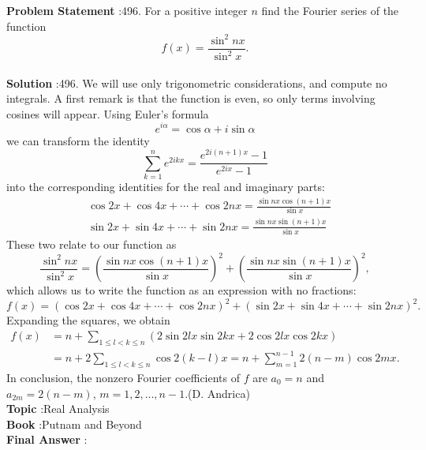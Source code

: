 \documentclass[10pt]{article}
\begin{document}
\textbf{Problem Statement} :496. For a positive integer $n$ find the Fourier series of the function$$ f(x)=\frac{\sin ^{2} n x}{\sin ^{2} x} . $$\\
\textbf{Solution} :496. We will use only trigonometric considerations, and compute no integrals. A first remark is that the function is even, so only terms involving cosines will appear. Using Euler's formula$$ e^{i \alpha}=\cos \alpha+i \sin \alpha $$we can transform the identity$$ \sum_{k=1}^{n} e^{2 i k x}=\frac{e^{2 i(n+1) x}-1}{e^{2 i x}-1} $$into the corresponding identities for the real and imaginary parts:$$ \begin{aligned} &\cos 2 x+\cos 4 x+\cdots+\cos 2 n x=\frac{\sin n x \cos (n+1) x}{\sin x} \\ &\sin 2 x+\sin 4 x+\cdots+\sin 2 n x=\frac{\sin n x \sin (n+1) x}{\sin x} \end{aligned} $$These two relate to our function as$$ \frac{\sin ^{2} n x}{\sin ^{2} x}=\left(\frac{\sin n x \cos (n+1) x}{\sin x}\right)^{2}+\left(\frac{\sin n x \sin (n+1) x}{\sin x}\right)^{2}, $$which allows us to write the function as an expression with no fractions:$$ f(x)=(\cos 2 x+\cos 4 x+\cdots+\cos 2 n x)^{2}+(\sin 2 x+\sin 4 x+\cdots+\sin 2 n x)^{2} . $$Expanding the squares, we obtain$$ \begin{aligned} f(x) &=n+\sum_{1 \leq l<k \leq n}(2 \sin 2 l x \sin 2 k x+2 \cos 2 l x \cos 2 k x) \\ &=n+2 \sum_{1 \leq l<k \leq n} \cos 2(k-l) x=n+\sum_{m=1}^{n-1} 2(n-m) \cos 2 m x . \end{aligned} $$In conclusion, the nonzero Fourier coefficients of $f$ are $a_{0}=n$ and $a_{2 m}=2(n-m)$, $m=1,2, \ldots, n-1$.(D. Andrica)\\
\textbf{Topic} :Real Analysis\\
\textbf{Book} :Putnam and Beyond\\
\textbf{Final Answer} :\\
\end{document}
